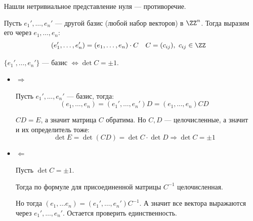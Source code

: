 Нашли нетривиальное представление нуля --- противоречие.

Пусть \( e_1', \ldots, e_n' \) --- другой базис (любой набор векторов) в \( \ZZ^n \).
Тогда выразим его через \( e_1, \ldots, e_n \):
\[
    (e_1', \ldots, e_n') = (e_1, \ldots, e_n) \cdot C \quad C = (c_{ij}), \ c_{ij} \in \ZZ 
\]

\begin{prop}{}{}
    \( \{ e_1', \ldots, e_n' \} \) --- базис \( \Leftrightarrow \det C = \pm 1 \).
\end{prop}

\begin{itemize}
    \item
        \( \Rightarrow \)

        Пусть \( e_1', \ldots, e_n' \) --- базис, тогда:
        \[
            (e_1, \ldots, e_n) = (e_1', \ldots, e_n') D = (e_1, \ldots, e_n) CD
        \]

        \( CD = E \), а значит матрица \( C \) обратима.
        Но \( C, D \) --- целочисленные, а значит и их определитель тоже:
        \[
            \det E = \det (CD) = \det C \cdot \det D \Rightarrow \det C = \pm 1
        \]
    \item
        \( \Leftarrow \)

        Пусть \( \det C = \pm 1 \).

        Тогда по формуле для присоединенной матрицы \( C^{-1} \) целочисленная.

        Но тогда \( (e_1, \ldots e_n) = (e_1', \ldots, e_n') C^{-1} \).
        А значит все вектора выражаются через \( e_1', \ldots, e_n' \).
        Остается проверить единственность.


\end{itemize}
